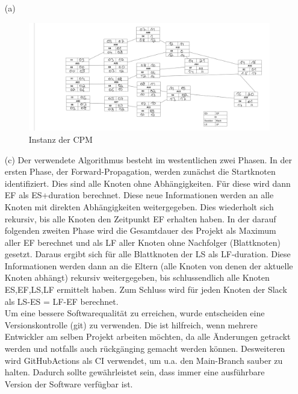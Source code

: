 \documentclass[12pt]{scrartcl}
\begin{document}



    \begin{enumerate}
        \item[(a)]{

\begin{figure}[h]
    \centering
    \includegraphics[width=1.0\textwidth]{./Tex-Graphics/Aufgabe1a.jpeg}
    \caption{Instanz der CPM}
\end{figure}
        }
        \item[(c)]{Der verwendete Algorithmus besteht im westentlichen zwei Phasen. In der ersten Phase, der Forward-Propagation, werden
        zunächst die Startknoten identifiziert. Dies sind alle Knoten ohne Abhängigkeiten. Für diese wird dann EF als ES+duration berechnet. Diese neue Informationen werden an alle Knoten mit direkten Abhängigkeiten weitergegeben. Dies wiederholt sich rekursiv, bis alle Knoten den Zeitpunkt EF erhalten haben. In der darauf folgenden zweiten Phase wird die Gesamtdauer des Projekt als Maximum aller EF berechnet und als LF aller Knoten ohne Nachfolger (Blattknoten) gesetzt. Daraus ergibt sich für alle Blattknoten der LS als LF-duration. Diese Informationen werden dann an die Eltern (alle Knoten von denen der aktuelle Knoten abhängt) rekursiv weitergegeben, bis schlussendlich alle Knoten ES,EF,LS,LF ermittelt haben. Zum Schluss wird für jeden Knoten der Slack als LS-ES = LF-EF berechnet. 
        \\
        Um eine bessere Softwarequalität zu erreichen, wurde entscheiden eine Versionskontrolle (git) zu verwenden. Die ist hilfreich, wenn mehrere Entwickler am selben Projekt arbeiten möchten, da alle Änderungen getrackt werden und notfalls auch rückgänging gemacht werden können. Desweiteren wird GitHubActions als CI verwendet, um u.a. den Main-Branch sauber zu halten. Dadurch sollte gewährleistet sein, dass immer eine ausführbare Version der Software verfügbar ist.
        }
    \end{enumerate}
\end{document}
